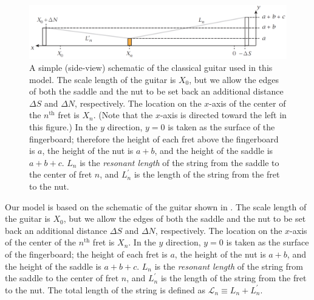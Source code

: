  \begin{figure}
  \centering
  \includegraphics[width=6.0in]{../figures/guitar_schematic}
  \caption{\label{fig:guitar_schematic} A simple (side-view) schematic of the classical guitar used in this model. The scale length of the guitar is $X_0$, but we allow the edges of both the saddle and the nut to be set back an additional distance $\Delta S$ and $\Delta N$, respectively. The location on the $x$-axis of the center of the $n^\textrm{th}$ fret is $X_n$. (Note that the $x$-axis is directed toward the left in this figure.) In the $y$ direction, $y = 0$ is taken as the surface of the fingerboard; therefore the height of each fret above the fingerboard is $a$, the height of the nut is $a + b$, and the height of the saddle is $a + b + c$. $L_n$ is the \emph{resonant length} of the string from the saddle to the center of fret $n$, and $L^\prime_n$ is the length of the string from the fret to the nut.}
 \end{figure}

Our model is based on the schematic of the guitar shown in . The scale length of the guitar is $X_0$, but we allow the edges of both the saddle and the nut to be set back an additional distance $\Delta S$ and $\Delta N$, respectively. The location on the $x$-axis of the center of the $n^\textrm{th}$ fret is $X_n$. In the $y$ direction, $y = 0$ is taken as the surface of the fingerboard; the height of each fret is $a$, the height of the nut is $a + b$, and the height of the saddle is $a + b + c$. $L_n$ is the \emph{resonant length} of the string from the saddle to the center of fret $n$, and $L^\prime_n$ is the length of the string from the fret to the nut. The total length of the string is defined as $\mathcal{L}_n \equiv L_n + L^\prime_n$.

